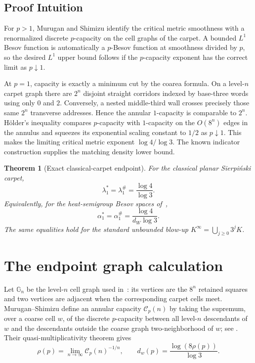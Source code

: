 \documentclass[10pt]{article}
\newtheorem{theorem}{Theorem}
\begin{document}
\subsection*{Proof Intuition}

For $p>1$, Murugan and Shimizu identify the critical metric smoothness with
a renormalized discrete $p$-capacity on the cell graphs of the carpet.  A
bounded $L^1$ Besov function is automatically a $p$-Besov function at
smoothness divided by $p$, so the desired $L^1$ upper bound follows if the
$p$-capacity exponent has the correct limit as $p\downarrow1$.

At $p=1$, capacity is exactly a minimum cut by the coarea formula.  On a
level-$n$ carpet graph there are $2^n$ disjoint straight corridors indexed by
base-three words using only $0$ and $2$.  Conversely, a nested middle-third
wall crosses precisely those same $2^n$ transverse addresses.  Hence the
annular $1$-capacity is comparable to $2^n$.  H\"older's inequality compares
$p$-capacity with $1$-capacity on the $O(8^n)$ edges in the annulus and
squeezes its exponential scaling constant to $1/2$ as $p\downarrow1$.
This makes the limiting critical metric exponent $\log4/\log3$.  The known
indicator construction supplies the matching density lower bound.

\begin{theorem}[Exact classical-carpet endpoint]\label{thm:main}
For the classical planar Sierpi\'nski carpet,
\begin{equation}\label{eq:main}
 \lambda_1^*=\lambda_1^\#=\frac{\log4}{\log3}.
\end{equation}
Equivalently, for the heat-semigroup Besov spaces of~\cite{ABCRST1},
\begin{equation}\label{eq:alpha}
 \boxed{\displaystyle
 \alpha_1^*=\alpha_1^\#=\frac{\log4}{d_W\log3}.}
\end{equation}
The same equalities hold for the standard unbounded blow-up
$K^\infty=\bigcup_{j\geq0}3^jK$.
\end{theorem}

\section{The endpoint graph calculation}

Let $\mathbb G_n$ be the level-$n$ cell graph used in~\cite{MS}: its
vertices are the $8^n$ retained squares and two vertices are adjacent when
the corresponding carpet cells meet.  Murugan--Shimizu define an annular
capacity $\mathcal C_p(n)$ by taking the supremum, over a coarse cell $w$,
of the discrete $p$-capacity between all level-$n$ descendants of $w$ and
the descendants outside the coarse graph two-neighborhood of $w$; see
\cite[Eq.~(8.3)]{MS}.  Their quasi-multiplicativity theorem gives
\begin{equation}\label{eq:rho}
 \rho(p)=\lim_{n\to\infty}\mathcal C_p(n)^{-1/n},\qquad
 d_w(p)=\frac{\log(8\rho(p))}{\log3}.
\end{equation}
\end{document}
